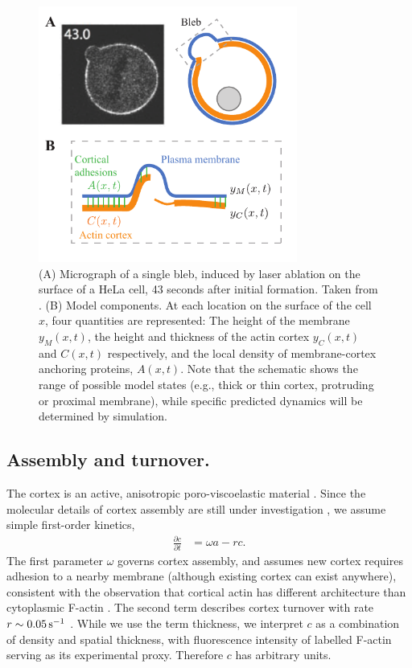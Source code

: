 \begin{figure}
   \begin{center}
   \captionsetup{width=\linewidth}
	\includegraphics*[width=8.5cm]{Project1/figs/figure1.pdf}
      \caption{(A) Micrograph of a single bleb, induced by laser ablation on the surface of a HeLa cell, 43 seconds after initial formation. Taken from \cite{Biro:2013bk}. (B) Model components. At each location on the surface of the cell $x$, four quantities are represented: The height of the membrane $y_M(x,t)$, the height and thickness of the actin cortex $y_C(x,t)$ and $C(x,t)$ respectively, and the local density of membrane-cortex anchoring proteins, $A(x,t)$. Note that the schematic shows the range of possible model states (e.g., thick or thin cortex, protruding or proximal membrane), while specific predicted dynamics will be determined by simulation.}
      \label{fig::schematic}
   \end{center}
\end{figure}

\subsection{Assembly and turnover.}
The cortex is an active, anisotropic poro-viscoelastic material \cite{Salbreux:2009fp,Hannezo:2015ba}. Since the molecular details of cortex assembly are still under investigation \cite{Bovellan:2014ka}, we assume simple first-order kinetics,
\begin{align}
\frac{\partial c}{\partial t} &= \omega a - r c. \label{eq::cortexKinetics}
\end{align}
The first parameter $\omega$ governs cortex assembly, and assumes new cortex requires adhesion to a nearby membrane (although existing cortex can exist anywhere), consistent with the observation that cortical actin has different architecture than cytoplasmic F-actin \cite{Clark:2013ef}. The second term describes cortex turnover with rate $r \sim 0.05 \,\mbox{s}^{-1}$ \cite{Fritzsche:2014jw}. While we use the term thickness, we interpret $c$ as a combination of density and spatial thickness, with fluorescence intensity of labelled F-actin serving as its experimental proxy. Therefore $c$ has arbitrary units.

